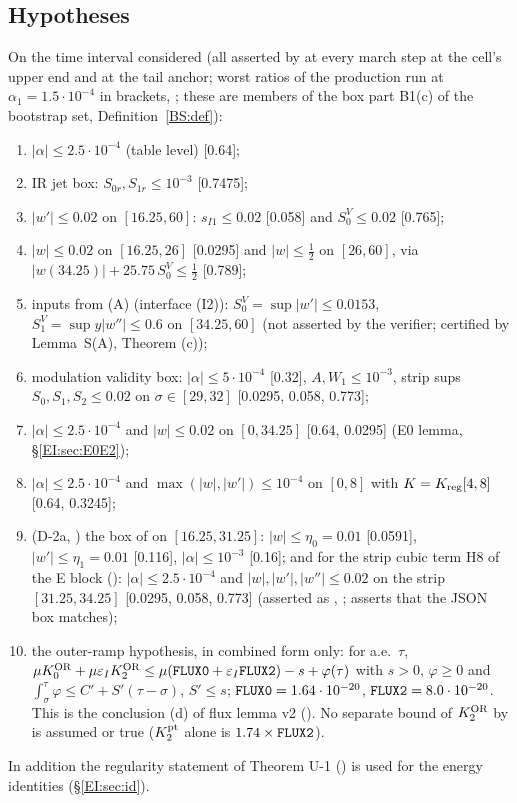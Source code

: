 \documentclass[11pt]{article}
\begin{document}
\subsection{Hypotheses}\label{EI:sec:hyp}
On the time interval considered (all asserted by  at every march step at the cell's upper end and at the tail anchor; worst ratios of the production run at $\alpha_1=1.5\cdot10^{-4}$ in brackets,  ; these are members of the box part B1(c) of the bootstrap set,  Definition~\ref{BS:def}):
\begin{enumerate}[label=\textup{(B-\alph*)},leftmargin=3.2em]
\item $|\alpha|\le2.5\cdot10^{-4}$ (table level) [0.64];
\item IR jet box: $S_{0r},S_{1r}\le10^{-3}$ [0.7475];
\item $|w'|\le0.02$ on $[16.25,60]$: $s_{I1}\le0.02$ [0.058] and $S^V_0\le0.02$ [0.765];
\item $|w|\le0.02$ on $[16.25,26]$ [0.0295] and $|w|\le\frac12$ on $[26,60]$, via $|w(34.25)|+25.75\,S^V_0\le\frac12$ [0.789];
\item inputs from (A) (interface (I2)): $S^V_0=\sup|w'|\le0.0153$, $S^V_1=\sup y|w''|\le0.6$ on $[34.25,60]$ (not asserted by the verifier; certified by Lemma~S(A),  Theorem (c));
\item modulation validity box: $|\alpha|\le5\cdot10^{-4}$ [0.32], $A,W_1\le10^{-3}$, strip sups $S_0,S_1,S_2\le0.02$ on $\sigma\in[29,32]$ [0.0295, 0.058, 0.773];
\item[(E0)] $|\alpha|\le2.5\cdot10^{-4}$ and $|w|\le0.02$ on $[0,34.25]$ [0.64, 0.0295] (E0 lemma, \S\ref{EI:sec:E0E2});
\item[(E2)] $|\alpha|\le2.5\cdot10^{-4}$ and $\max(|w|,|w'|)\le10^{-4}$ on $[0,8]$ with $K=K_{\rm reg}[4,8]$ [0.64, 0.3245];
\item[(H8)] (D-2a, ) the box of  on $[16.25,31.25]$: $|w|\le\eta_0=0.01$ [0.0591], $|w'|\le\eta_1=0.01$ [0.116], $|\alpha|\le10^{-3}$ [0.16]; and for the strip cubic term H8 of the E block (): $|\alpha|\le2.5\cdot10^{-4}$ and $|w|,|w'|,|w''|\le0.02$ on the strip $[31.25,34.25]$ [0.0295, 0.058, 0.773] (asserted as , ;  asserts that the JSON box matches);
\item[(I3$'$)] the outer-ramp hypothesis, in combined form only: for a.e.\ $\tau$, $\mu K_0^{\OR}+\mu\eI K_2^{\OR}\le\mu(\fn{FLUX0}+\eI\fn{FLUX2})-s+\varphi(\tau)$ with $s>0$, $\varphi\ge0$ and $\int_\sigma^\tau\varphi\le C'+S'(\tau-\sigma)$, $S'\le s$; $\fn{FLUX0}=1.64\cdot10^{-20}$, $\fn{FLUX2}=8.0\cdot10^{-20}$. This is the conclusion (d) of flux lemma v2 (). No separate bound of $K_2^{\mathrm{OR}}$ by  is assumed or true ($K_2^{\rm pt}$ alone is $1.74\times\fn{FLUX2}$).
\end{enumerate}
In addition the regularity statement of Theorem U-1 () is used for the energy identities (\S\ref{EI:sec:id}).
\end{document}

